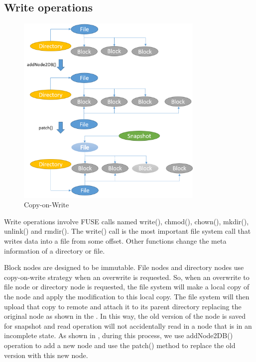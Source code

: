 \subsection{Write operations}

\begin{figure}[hbtp]
\centering
\includegraphics[width=0.8\textwidth]{Chapter-3/figs/fig10.png}
\caption{Copy-on-Write}
\label{fig:cow}
\end{figure}

    Write operations involve FUSE calls named write(), chmod(), chown(), mkdir(), unlink() and rmdir(). The write() call is the most important file system call that writes data into a file from some offset. Other functions change the meta information of a directory or file.

    Block nodes are designed to be immutable. File nodes and directory nodes use copy-on-write strategy when an overwrite is requested. So, when an overwrite to file node or directory node is requested, the file system will make a local copy of the node and apply the modification to this local copy. The file system will then upload that copy to remote and attach it to its parent directory replacing the original node as shown in the . In this way, the old version of the node is saved for snapshot and read operation will not accidentally read in a node that is in an incomplete state. As shown in , during this process, we use addNode2DB() operation to add a new node and use the patch() method to replace the old version with this new node.

